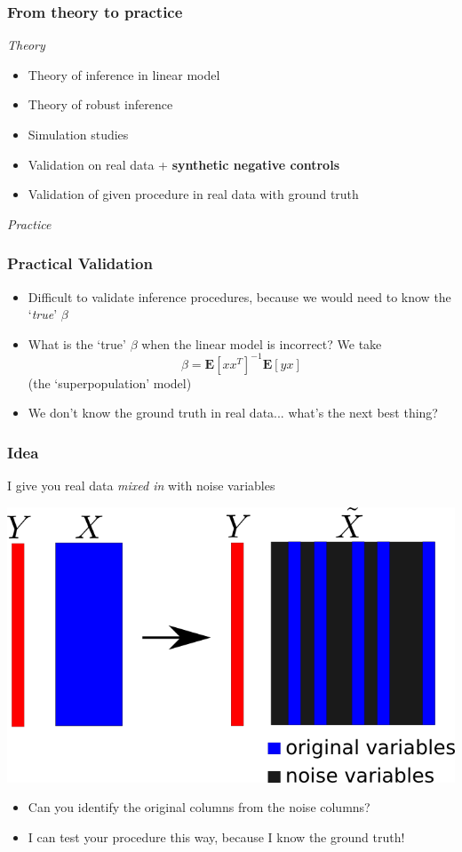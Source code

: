 \documentclass{beamer}
\newcommand{\E}{\textbf{E}}
\begin{document}
\begin{frame}
\frametitle{From theory to practice}
\emph{Theory}
\begin{itemize}
\item<1-> Theory of inference in linear model
\item<3-> Theory of robust inference
\item<4-> Simulation studies
\item<5-> Validation on real data + \textbf{synthetic negative controls}
\item<2-> Validation of given procedure in real data with ground truth
\end{itemize}
\emph{Practice}
\end{frame}

\begin{frame}
\frametitle{Practical Validation}
\begin{itemize}
\item Difficult to validate inference procedures, because we would need to know the `\emph{true}' $\beta$
\item What is the `true' $\beta$ when the linear model is incorrect? We take
\[
\beta = \E[x x^T]^{-1} \E[yx]
\]
(the `superpopulation' model)
\item We don't know the ground truth in real data... what's the next best thing?
\end{itemize}
\end{frame}

\begin{frame}
\frametitle{Idea}
I give you real data \emph{mixed in} with noise variables
\begin{center}
\includegraphics[scale = 0.35]{anc.png}
\end{center}
\begin{itemize}
\item Can you identify the original columns from the noise columns?
\item I can test your procedure this way, because I know the ground truth!
\end{itemize}
\end{frame}
\end{document}
